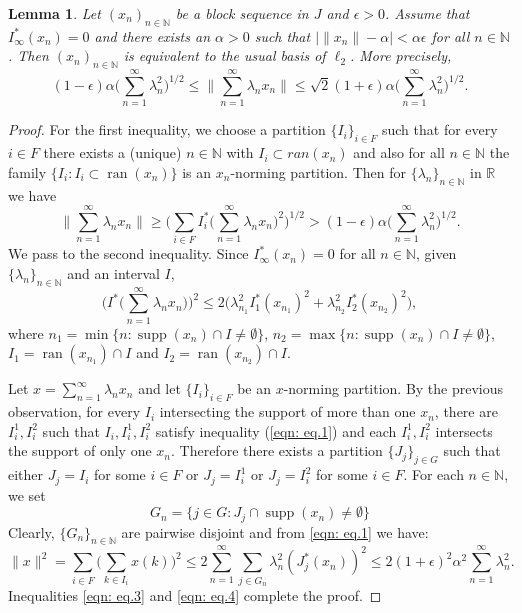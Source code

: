 \documentclass[12pt]{amsart}
\theoremstyle{plain}
\numberwithin{equation}{section}
\newcommand{\N}{\mathbb{N}}
\newcommand{\R}{\mathbb{R}}
\DeclareMathOperator{\supp}{supp}
\DeclareMathOperator{\ran}{ran}
\newtheorem{lemma}[theorem]{Lemma}
\begin{document}
\begin{lemma}\label{L6}
Let $(x_n)_{n\in \N}$ be a block sequence in $J$ and $\epsilon > 0$. Assume that $I_{\infty}^*(x_n) = 0$ and there exists an $\alpha> 0$ such that $\big| \|x_n\| - \alpha\big| < \alpha \epsilon$ for all $n\in \N$. Then $(x_n)_{n\in \N}$ is equivalent to the usual basis of $\ell_2$. More precisely,
\begin{equation}\label{eqn: eq.2}
(1 - \epsilon) \alpha \Big(\sum_{n=1}^\infty \lambda_n^2\Big)^{1/2} \le \Big\|\sum_{n=1}^\infty \lambda_n x_n\Big\| \le \sqrt{2} (1 + \epsilon) \alpha \Big(\sum_{n=1}^\infty \lambda_n^2\Big)^{1/2}.
\end{equation}
\end{lemma}
\begin{proof}
For the first inequality, we choose a partition $\{I_i\}_{i\in F}$ such that for every $i\in F$ there exists a (unique) $n\in \N$ with $I_i \subset ran(x_n)$ and also for all $n\in \N$ the family $\{I_i : I_i \subset \ran(x_n)\}$ is an $x_n$-norming partition. Then for $\{\lambda_n\}_{n\in\N}$ in $\R$ we have
\begin{equation}\label{eqn: eq.3}
\Big\| \sum_{n=1}^\infty \lambda_n x_n \Big\| \geq \Big( \sum_{i \in F} I_i^* \Big( \sum_{n=1}^\infty \lambda_n x_n\Big)^2 \Big)^{1/2} > (1-\epsilon) \alpha \Big(\sum_{n=1}^\infty \lambda_n^2 \Big)^{1/2}.
\end{equation}
We pass to the second inequality. Since $I_{\infty}^*(x_n) = 0$ for all $n\in \N$, given $\{\lambda_n \}_{n\in \N}$ and an interval $I$,
\begin{equation}\label{eqn: eq.1}
\Big( I^*\Big( \sum_{n=1}^\infty \lambda_n x_n\Big) \Big)^2 \leq 2\Big( \lambda_{n_1}^2 I_1^*(x_{n_1})^2 + \lambda_{n_2}^2 I_2^*(x_{n_2})^2 \Big),
\end{equation}
where $n_1= \min\{ n : \supp(x_n) \cap I \neq \emptyset\}$, $n_2 = \max\{ n : \supp(x_n) \cap I \neq \emptyset\}$, $I_1 = \ran(x_{n_1}) \cap I$ and $I_2 = \ran(x_{n_2}) \cap I$.

Let $x = \sum_{n=1}^\infty \lambda_n x_n$ and let $\{ I_i\}_{i\in F}$ be an $x$-norming partition. By the previous observation, for every $I_i$ intersecting the support of more than one $x_n$, there are $I_i^1, I_i^2$ such that $I_i, I_i^1, I_i^2$ satisfy inequality (\ref{eqn: eq.1}) and each $I_i^1, I_i^2$ intersects the support of only one $x_n$.
Therefore there exists a partition $\{J_j\}_{j\in G}$ such that either $J_j = I_i$ for some $i\in F$ or $J_j = I_i^1$ or $J_j = I_i^2$ for some $i\in F$. For each $n\in \N$, we set
\[ G_n = \{ j\in G : J_j \cap \supp(x_n) \neq \emptyset \} \]
Clearly, $\{G_n\}_{n\in \N}$ are pairwise disjoint and from \ref{eqn: eq.1} we have:
\begin{equation}\label{eqn: eq.4}
\|x\|^2 =  \sum_{i\in F} \Big( \sum_{k\in I_i} x(k) \Big)^2 \leq 2 \sum_{n=1}^\infty \sum_{j\in G_n} \lambda_n^2(J_j^*(x_n))^2  \leq 2(1+ \epsilon)^2 \alpha^2 \sum_{n=1}^\infty \lambda_n^2.
\end{equation}
Inequalities \ref{eqn: eq.3} and \ref{eqn: eq.4} complete the proof.
\end{proof}
\end{document}
